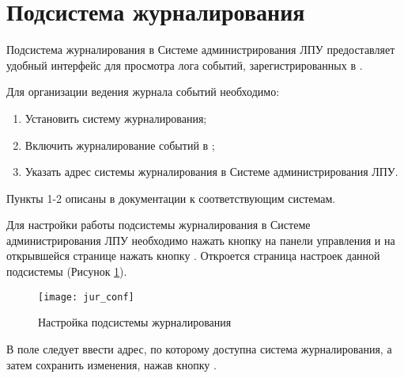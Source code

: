 \newpage
\section{Подсистема журналирования}

Подсистема журналирования в Системе администрирования ЛПУ предоставляет удобный интерфейс для просмотра лога событий, зарегистрированных в \tmis.

Для организации ведения журнала событий необходимо:
\begin{enumerate}
 \item Установить систему журналирования;
 \item Включить журналирование событий в \tmis;
 \item Указать адрес системы журналирования в Системе администрирования ЛПУ.
\end{enumerate}
 
Пункты 1-2 описаны в документации к соответствующим системам.

Для настройки работы подсистемы журналирования в Системе администрирования ЛПУ необходимо нажать кнопку  на панели управления и на открывшейся странице нажать кнопку . Откроется страница настроек данной подсистемы (Рисунок \ref{img_jur_conf}).

\begin{figure}[ht]\centering
 \texttt{[image: jur\_conf]}
 \caption{Настройка подсистемы журналирования}
 \label{img_jur_conf}
\end{figure}

В поле  следует ввести адрес, по которому доступна система журналирования, а затем сохранить изменения, нажав кнопку .